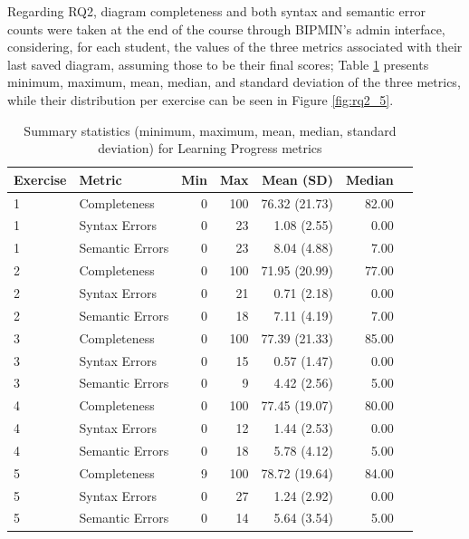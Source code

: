 
Regarding RQ2, diagram completeness and both syntax and semantic error counts were taken at the end of the course through BIPMIN's admin interface, considering, for each student, the values of the three metrics associated with their last saved diagram, assuming those to be their final scores; Table \ref{tab:rq2_5} presents minimum, maximum, mean, median, and standard deviation of the three metrics, while their distribution per exercise can be seen in Figure \ref{fig:rq2_5}.

\begin{table}[ht]
    \footnotesize
    \centering
    \caption{Summary statistics (minimum, maximum, mean, median, standard deviation) for Learning Progress metrics}
    \begin{tabular}{llrrrrr}
    \toprule
    Exercise & Metric & Min & Max & Mean (SD) & Median \\
    \midrule
    1 & Completeness         &  0 & 100 & 76.32 (21.73) & 82.00 \\
    1 & Syntax Errors    &  0 &  23 &  1.08 (2.55)  &  0.00 \\
    1 & Semantic Errors  &  0 &  23 &  8.04 (4.88)  &  7.00 \\
    \midrule
    2 & Completeness        &  0 & 100 & 71.95 (20.99) & 77.00 \\
    2 & Syntax Errors    &  0 &  21 &  0.71 (2.18)  &  0.00 \\
    2 & Semantic Errors  &  0 &  18 &  7.11 (4.19)  &  7.00 \\
    \midrule
    3 & Completeness         &  0 & 100 & 77.39 (21.33) & 85.00 \\
    3 & Syntax Errors    &  0 &  15 &  0.57 (1.47)  &  0.00 \\
    3 & Semantic Errors  &  0 &   9 &  4.42 (2.56)  &  5.00 \\
    \midrule
    4 & Completeness         &  0 & 100 & 77.45 (19.07) & 80.00 \\
    4 & Syntax Errors    &  0 &  12 &  1.44 (2.53)  &  0.00 \\
    4 & Semantic Errors  &  0 &  18 &  5.78 (4.12)  &  5.00 \\
    \midrule
    5 & Completeness         &  9 & 100 & 78.72 (19.64) & 84.00 \\
    5 & Syntax Errors    &  0 &  27 &  1.24 (2.92)  &  0.00 \\
    5 & Semantic Errors  &  0 &  14 &  5.64 (3.54)  &  5.00 \\
    \bottomrule
    \end{tabular}
    \label{tab:rq2_5}
\end{table}


